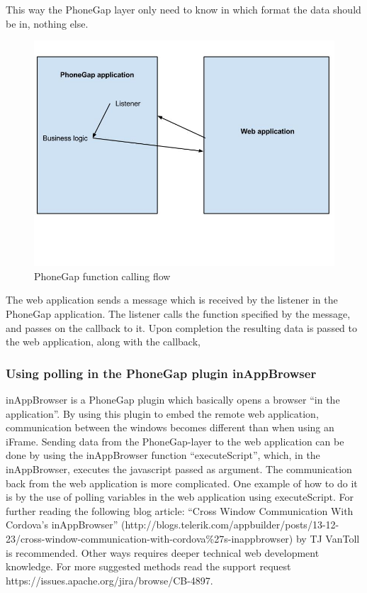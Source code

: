 \documentclass{cslthse-msc}
\begin{document}
This way the PhoneGap layer only need to know in which format the data should be in, nothing else. 
\begin{figure}[ht!]
    \centering
    \includegraphics[width=120mm,natwidth=800,natheight=600]{../img/phoneGapFlow.jpg}
    \caption{PhoneGap function calling flow \label{caption-phonegap-flow}}
\end{figure}
\newline
The web application sends a message which is received by the listener in the PhoneGap application. The listener calls the function specified by the message, and passes on the callback to it. Upon completion the resulting data is passed to the web application, along with the callback, 

\subsubsection{Using polling in the PhoneGap plugin inAppBrowser}

inAppBrowser is a PhoneGap plugin which basically opens a browser “in the application”. By using this plugin to embed the remote web application, communication between the windows becomes different than when using an iFrame. Sending data from the PhoneGap-layer to the web application can be done by using the inAppBrowser function “executeScript”, which, in the inAppBrowser, executes the javascript passed as argument.
The communication back from the web application is more complicated. One example of how to do it is by the use of polling variables in the web application using executeScript. For further reading the following blog article: “Cross Window Communication With Cordova’s inAppBrowser” (http://blogs.telerik.com/appbuilder/posts/13-12-23/cross-window-communication-with-cordova\%27s-inappbrowser) by TJ VanToll is recommended. 
\newline\newline
Other ways requires deeper technical web development knowledge. For more suggested methods read the support request https://issues.apache.org/jira/browse/CB-4897.
\end{document}

